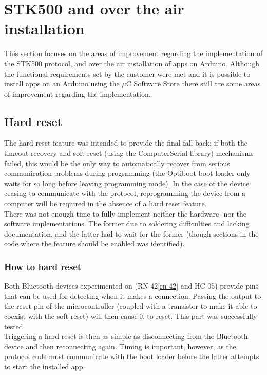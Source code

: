 \section{STK500 and over the air installation}
This section focuses on the areas of improvement regarding the implementation of the STK500 protocol, and over the air installation of apps on Arduino. Although the functional requirements set by the customer were met and it is possible to  install apps on an Arduino using the $\mu$C Software Store there still are some areas of improvement regarding the implementation.

	\subsection{Hard reset}
    The hard reset feature was intended to provide the final fall back; if both the timeout recovery and soft reset
    (using the ComputerSerial library) mechanisms failed, this would be the only way to automatically recover from
    serious communication problems during programming (the Optiboot boot loader only waits for so long before leaving
    programming mode). In the case of the device ceasing to communicate with the protocol, reprogramming the device
    from a computer will be required in the absence of a hard reset feature.\\
    There was not enough time to fully implement neither the hardware- nor the software implementations. The former
    due to soldering difficulties and lacking documentation, and the latter had to wait for the former (though
    sections in the code where the feature should be enabled was identified).

	   \subsubsection{How to hard reset}
    	Both Bluetooth devices experimented on (RN-42\ref{rn-42} and HC-05) provide pins that can be used for detecting
        when it makes a connection. Passing the output to the reset pin of the microcontroller (coupled with a
        transistor to make it able to coexist with the soft reset) will then cause it to reset. This part was
        successfully tested.\\

        Triggering a hard reset is then as simple as disconnecting from the Bluetooth device and then reconnecting
        again. Timing is important, however, as the protocol code must communicate with the boot loader before
        the latter attempts to start the installed app.
	
